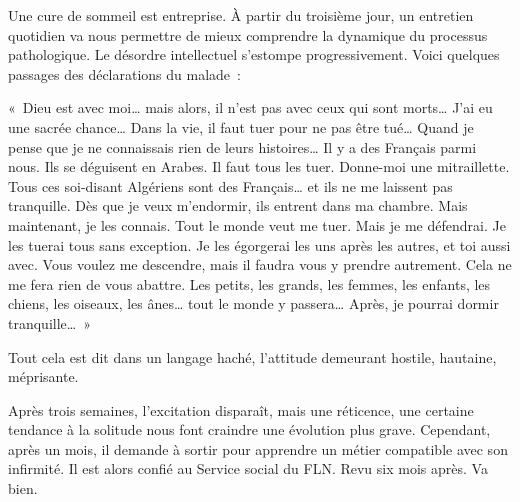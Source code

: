 \documentclass[french,twoside]{book} %
\begin{document}
Une cure de sommeil est entreprise. À partir du troisième jour, un entretien quotidien va nous permettre de mieux comprendre la dynamique du processus pathologique. Le désordre intellectuel s’estompe progressivement. Voici quelques passages des déclarations du malade :\par
« Dieu est avec moi… mais alors, il n’est pas avec ceux qui sont morts… J’ai eu une sacrée chance… Dans la vie, il faut tuer pour ne pas être tué… Quand je pense que je ne connaissais rien de leurs histoires… Il y a des Français parmi nous. Ils se déguisent en Arabes. Il faut tous les tuer. Donne-moi une mitraillette. Tous ces soi-disant Algériens sont des Français… et ils ne me laissent pas tranquille. Dès que je veux m’endormir, ils entrent dans ma chambre. Mais maintenant, je les connais. Tout le monde veut me tuer. Mais je me défendrai. Je les tuerai tous sans exception. Je les égorgerai les uns après les autres, et toi aussi avec. Vous voulez me descendre, mais il faudra vous y prendre autrement. Cela ne me fera rien de vous abattre. Les petits, les grands, les femmes, les enfants, les chiens, les oiseaux, les ânes… tout le monde y passera… Après, je pourrai dormir tranquille… »\par
Tout cela est dit dans un langage haché, l’attitude demeurant hostile, hautaine, méprisante.\par
Après trois semaines, l’excitation disparaît, mais une réticence, une certaine tendance à la solitude nous font craindre une évolution plus grave. Cependant, après un mois, il demande à sortir pour apprendre un métier compatible avec son infirmité. Il est alors confié au Service social du FLN. Revu six mois après. Va bien.
\end{document}
